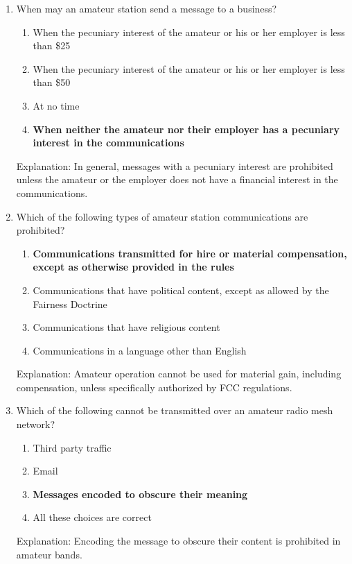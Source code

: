 \begin{enumerate}
    \item When may an amateur station send a message to a business?
      \begin{enumerate}
        \item When the pecuniary interest of the amateur or his or her employer is less than \$25
          \item  When the pecuniary interest of the amateur or his or her employer is less than \$50
       \item  At no time
       \item \textbf {When neither the amateur nor their employer has a pecuniary interest in the communications}
        \end{enumerate}
    \textcolor{myred}{Explanation:}
      In general, messages with a pecuniary interest are prohibited unless the amateur or the employer does not have a financial interest in the communications.
       
       \item Which of the following types of amateur station communications are prohibited?
      \begin{enumerate}
        \item \textbf {Communications transmitted for hire or material compensation, except as otherwise provided in the rules}
      \item  Communications that have political content, except as allowed by the Fairness Doctrine
      \item  Communications that have religious content
     \item  Communications in a language other than English
        \end{enumerate}
    \textcolor{myred}{Explanation:}
     Amateur operation cannot be used for material gain, including compensation, unless specifically authorized by FCC regulations.
     
     \item Which of the following cannot be transmitted over an amateur radio mesh network?
      \begin{enumerate}
      \item Third party traffic
          \item  Email
       \item \textbf {Messages encoded to obscure their meaning}
       \item  All these choices are correct
      \end{enumerate}
      \textcolor{myred}{Explanation:}
      Encoding the message to obscure their content is prohibited in amateur bands.
       

\end{enumerate}
